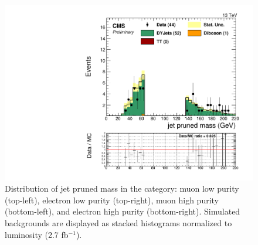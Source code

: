 \begin{figure}[h]
\begin{center}
\includegraphics[scale=0.37]{figures/control/massZjjEHP.pdf}
\caption[Distribution of jet pruned mass]{Distribution of jet pruned mass in the category: muon low purity (top-left), electron low purity (top-right), muon high purity (bottom-left), and  electron high purity (bottom-right). Simulated backgrounds are displayed as stacked histograms normalized to luminosity (2.7 fb$^{-1}$).}
\label{massZjj_VZ}
\end{center}
\end{figure}
